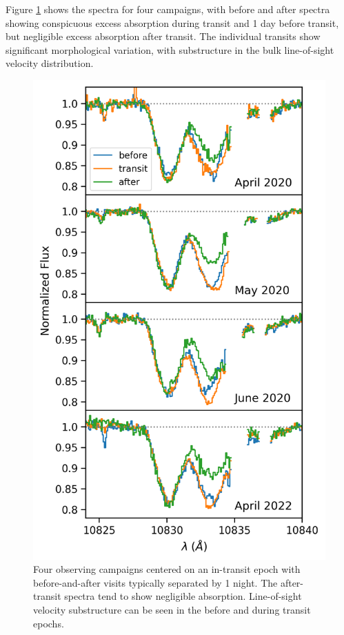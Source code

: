 \documentclass[twocolumn]{aastex631}
\begin{document}
Figure \ref{fig:HPFperCampaign} shows the spectra for four campaigns, with before and after spectra showing conspicuous excess absorption during transit and 1 day before transit, but negligible excess absorption after transit.  The individual transits show significant morphological variation, with substructure in the bulk line-of-sight velocity distribution.

\begin{figure}
    \includegraphics[width=\linewidth]{figures/HAT_P_67b_byCampaign_Spectra.png}
    \caption{Four observing campaigns centered on an in-transit epoch with before-and-after visits typically separated by 1 night. The after-transit spectra tend to show negligible absorption.  Line-of-sight velocity substructure can be seen in the before and during transit epochs.}
    \label{fig:HPFperCampaign}
\end{figure}
\end{document}
